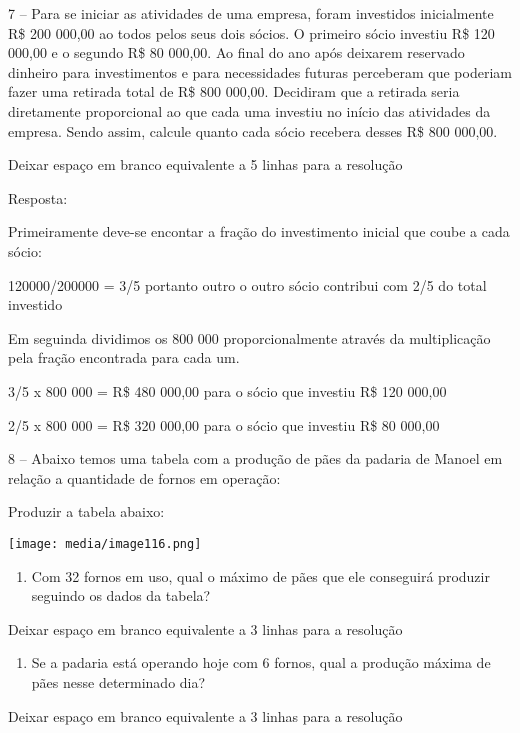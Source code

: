 7 -- Para se iniciar as atividades de uma empresa, foram investidos
inicialmente R\$ 200 000,00 ao todos pelos seus dois sócios. O primeiro
sócio investiu R\$ 120 000,00 e o segundo R\$ 80 000,00. Ao final do ano
após deixarem reservado dinheiro para investimentos e para necessidades
futuras perceberam que poderiam fazer uma retirada total de R\$ 800
000,00. Decidiram que a retirada seria diretamente proporcional ao que
cada uma investiu no início das atividades da empresa. Sendo assim,
calcule quanto cada sócio recebera desses R\$ 800 000,00.

Deixar espaço em branco equivalente a 5 linhas para a resolução

Resposta:

Primeiramente deve-se encontar a fração do investimento inicial que
coube a cada sócio:

120000/200000 = 3/5 portanto outro o outro sócio contribui com 2/5 do
total investido

Em seguinda dividimos os 800 000 proporcionalmente através da
multiplicação pela fração encontrada para cada um.

3/5 x 800 000 = R\$ 480 000,00 para o sócio que investiu R\$ 120 000,00

2/5 x 800 000 = R\$ 320 000,00 para o sócio que investiu R\$ 80 000,00

8 -- Abaixo temos uma tabela com a produção de pães da padaria de Manoel
em relação a quantidade de fornos em operação:

Produzir a tabela abaixo:

\texttt{[image: media/image116.png]}

\begin{enumerate}
\def\labelenumi{\alph{enumi})}
\item
  Com 32 fornos em uso, qual o máximo de pães que ele conseguirá
  produzir seguindo os dados da tabela?
\end{enumerate}

Deixar espaço em branco equivalente a 3 linhas para a resolução

\begin{enumerate}
\def\labelenumi{\alph{enumi})}
\item
  Se a padaria está operando hoje com 6 fornos, qual a produção máxima
  de pães nesse determinado dia?
\end{enumerate}

Deixar espaço em branco equivalente a 3 linhas para a resolução

